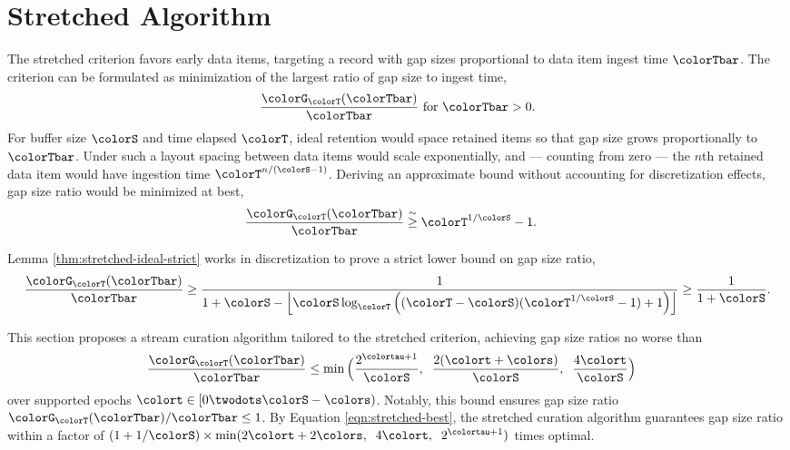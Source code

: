 \section{Stretched Algorithm} \label{sec:stretched}

The stretched criterion favors early data items, targeting a record with gap sizes proportional to data item ingest time $\colorTbar$.
The criterion can be formulated as minimization of the largest ratio of gap size to ingest time,
\begin{align*}
\frac{\colorG_{\colorT}(\colorTbar)}{\colorTbar} \text{ for } \colorTbar > 0.
\end{align*}
For buffer size $\colorS$ and time elapsed $\colorT$, ideal retention would space retained items so that gap size grows proportionally to $\colorTbar$.
Under such a layout spacing between data items would scale exponentially, and --- counting from zero --- the $n$th retained data item would have ingestion time $\colorT^{n/(\colorS - 1)}$.
Deriving an approximate bound without accounting for discretization effects, gap size ratio would be minimized at best,
\begin{align}
\label{eqn:approx-gap-bound}
\frac{\colorG_{\colorT}(\colorTbar)}{\colorTbar}
&\stackrel{\sim}{\geq}
\colorT^{1/\colorS} - 1.
\end{align}

Lemma \ref{thm:stretched-ideal-strict} works in discretization to prove a strict lower bound on gap size ratio,
\begin{align}
\frac{\colorG_{\colorT}(\colorTbar)}{\colorTbar}
\geq
\frac{
  1
}{
  1 + \colorS
  - \left\lfloor \colorS \log_{\colorT}\Big(
    (\colorT - \colorS)(\colorT^{1/\colorS} - 1) + 1
  \Big)\right\rfloor
}
\geq
\frac{
  1
}{
  1 + \colorS
}.
\label{eqn:stretched-best}
\end{align}

This section proposes a stream curation algorithm tailored to the stretched criterion, achieving gap size ratios no worse than
\begin{align*}
\frac{\colorG_{\colorT}(\colorTbar)}{\colorTbar}
&\leq
\min\Big(
  \frac{2^{\colortau + 1}}{\colorS},\;\;
  \frac{2(\colort + \colors)}{\colorS},\;\;
  \frac{4\colort}{\colorS}
\Big)
\end{align*}
over supported epochs $\colort \in [0\twodots\colorS - \colors)$.
Notably, this bound ensures gap size ratio ${\colorG_{\colorT}(\colorTbar)}/{\colorTbar} \leq 1$.
By Equation \ref{eqn:stretched-best}, the stretched curation algorithm guarantees gap size ratio within a factor of $(1 + 1/\colorS)\times\min(2\colort + 2\colors, \;\; 4\colort, \;\; 2^{\colortau + 1})$ times optimal.

